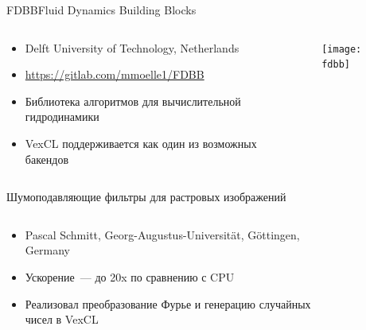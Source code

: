 \documentclass[@BEAMER_OPTIONS@]{beamer}
\newcommand{\www}[1]{\href{#1}{#1}}
\begin{document}
\begin{frame}{FDBB}{Fluid Dynamics Building Blocks}
    \begin{columns}
        \begin{column}{0.5\textwidth}
            \begin{itemize}
                \item Delft University of Technology, Netherlands
                \item \www{https://gitlab.com/mmoelle1/FDBB}
                \item Библиотека алгоритмов для вычислительной гидродинамики
                \item VexCL поддерживается как один из возможных бакендов
            \end{itemize}
        \end{column}
        \begin{column}{0.5\textwidth}
            \begin{figure}
                \texttt{[image: fdbb]}
            \end{figure}
        \end{column}
    \end{columns}
\end{frame}



\begin{frame}{Шумоподавляющие фильтры для растровых изображений}
    \begin{columns}
        \begin{column}{0.4\textwidth}
            \begin{itemize}
                \item Pascal Schmitt, Georg-Augustus-Universit\"at,
                    G\"ottingen, Germany
                \item Ускорение~--- до 20x по сравнению с CPU
                \item Реализовал преобразование Фурье и генерацию случайных
                    чисел в VexCL
            \end{itemize}
        \end{column}
        \begin{column}{0.55\textwidth}
            \vspace{-1\baselineskip}
            \begin{figure}
            \end{figure}
        \end{column}
    \end{columns}
\end{frame}
\end{document}
